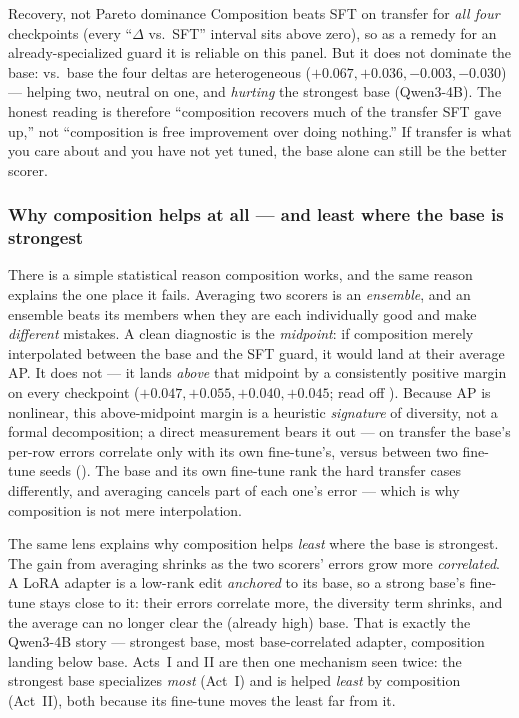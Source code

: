 \begin{takeaway}{Recovery, not Pareto dominance}
Composition beats SFT on transfer for \emph{all four} checkpoints (every ``$\Delta$ vs.\ SFT''
interval sits above zero), so as a remedy for an already-specialized guard it is reliable on this
panel. But it does not dominate the base: vs.\ base the four deltas are heterogeneous
($+0.067,+0.036,-0.003,-0.030$) --- helping two, neutral on one, and \emph{hurting} the strongest
base (Qwen3-4B). The honest reading is therefore ``composition recovers much of the transfer SFT
gave up,'' not ``composition is free improvement over doing nothing.'' If transfer is what you
care about and you have not yet tuned, the base alone can still be the better scorer.
\end{takeaway}

\subsubsection{Why composition helps at all --- and least where the base is strongest}
\label{sec:actIII-why}

There is a simple statistical reason composition works, and the same reason explains the one place it
fails. Averaging two scorers is an \emph{ensemble}, and an ensemble beats its members when they are each
individually good and make \emph{different} mistakes. A clean diagnostic is the \emph{midpoint}: if
composition merely interpolated between the base and the SFT guard, it would land at their average AP. It
does not --- it lands \emph{above} that midpoint by a consistently positive margin on every checkpoint
($+0.047,+0.055,+0.040,+0.045$; read off ). Because AP is nonlinear, this
above-midpoint margin is a heuristic \emph{signature} of diversity, not a formal decomposition; a direct
measurement bears it out --- on transfer the base's per-row errors correlate only \EnsErrCorrBaseSFT{} with
its own fine-tune's, versus \EnsErrCorrSFTSFT{} between two fine-tune seeds (). The
base and its own fine-tune rank the hard transfer cases differently, and averaging cancels part of each
one's error --- which is why composition is not mere interpolation.

The same lens explains why composition helps \emph{least} where the base is strongest. The gain from
averaging shrinks as the two scorers' errors grow more \emph{correlated}. A LoRA adapter is a low-rank edit
\emph{anchored} to its base, so a strong base's fine-tune stays close to it: their errors correlate more,
the diversity term shrinks, and the average can no longer clear the (already high) base. That is exactly the
Qwen3-4B story --- strongest base, most base-correlated adapter, composition landing below base. Acts~I and
II are then one mechanism seen twice: the strongest base specializes \emph{most} (Act~I) and is helped
\emph{least} by composition (Act~II), both because its fine-tune moves the least far from it.

